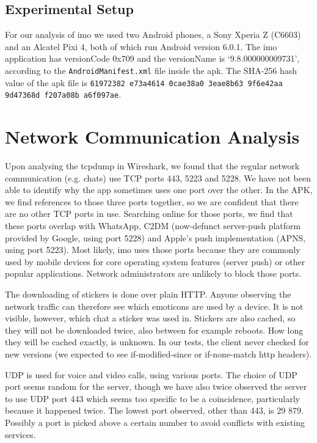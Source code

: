 \documentclass[conference]{IEEEtran}
\begin{document}
\subsection{Experimental Setup}\label{sec:setup}

For our analysis of imo we used two Android phones, a Sony Xperia Z (C6603) and
an Alcatel Pixi 4, both of which run Android version 6.0.1. The imo application
has versionCode 0x709 and the versionName is `9.8.000000009731', according to
the \texttt{AndroidManifest.xml} file inside the apk. The SHA-256 hash value of
the apk file is \texttt{61972382 e73a4614 0cae38a0 3eae8b63 9f6e42aa 9d47368d
f207a08b a6f097ae}.


\section{Network Communication Analysis}\label{sec:network}

Upon analysing the tcpdump in Wireshark, we found that the regular network
communication (e.g. chats) use TCP ports 443, 5223 and 5228. We have not been
able to identify why the app sometimes uses one port over the other. In the APK,
we find references to those three ports together, so we are confident that there
are no other TCP ports in use.  Searching online for those ports, we find that
these ports overlap with WhatsApp, C2DM (now-defunct server-push platform
provided by Google, using port 5228) and Apple's push implementation (APNS,
using port 5223). Most likely, imo uses those ports because they are commonly
used by mobile devices for core operating system features (server push) or other
popular applications. Network administrators are unlikely to block those ports.

The downloading of stickers is done over plain HTTP. Anyone observing the
network traffic can therefore see which emoticons are used by a device. It is
not visible, however, which chat a sticker was used in. Stickers are also
cached, so they will not be downloaded twice, also between for example reboots.
How long they will be cached exactly, is unknown. In our tests, the client
never checked for new versions (we expected to see if-modified-since or
if-none-match http headers).

UDP is used for voice and video calls, using various ports. The choice of UDP
port seems random for the server, though we have also twice observed the server
to use UDP port 443 which seems too specific to be a coincidence, particularly
because it happened twice. The lowest port observed, other than 443, is 29 879.
Possibly a port is picked above a certain number to avoid conflicts with
existing services.
\end{document}
